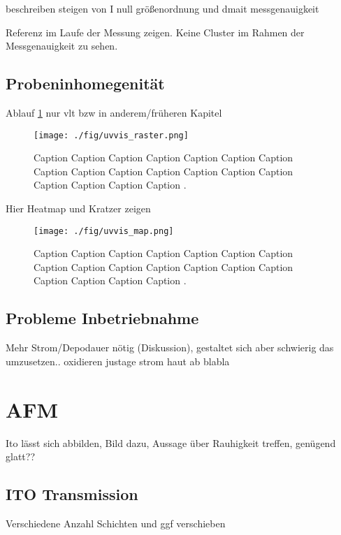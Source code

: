 beschreiben steigen von I null
größenordnung und dmait messgenauigkeit







Referenz im Laufe der Messung zeigen.
Keine Cluster im Rahmen der Messgenauigkeit zu sehen.

\subsection{Probeninhomegenität}

Ablauf \ref{fig:uvvis_raster} nur vlt bzw in anderem/früheren Kapitel
\blindtext
\begin{figure}
    \centering
    \texttt{[image: ./fig/uvvis\_raster.png]}
    \caption{Caption Caption Caption Caption Caption Caption Caption Caption Caption Caption Caption Caption Caption Caption Caption Caption Caption Caption .}
    \label{fig:uvvis_raster}
\end{figure}

\blindtext
Hier Heatmap und Kratzer zeigen
\blindtext
\begin{figure}
    \centering
    \texttt{[image: ./fig/uvvis\_map.png]}
    \caption{Caption Caption Caption Caption Caption Caption Caption Caption Caption Caption Caption Caption Caption Caption Caption Caption Caption Caption .}
    \label{fig:uvvis_map}
\end{figure}
\blindtext
\subsection{Probleme Inbetriebnahme}
Mehr Strom/Depodauer nötig (Diskussion), gestaltet sich aber schwierig das umzusetzen.. oxidieren justage strom haut ab blabla
\section{AFM}
Ito lässt sich abbilden, Bild dazu, Aussage über Rauhigkeit treffen, genügend glatt?? \

\blindmathpaper

\subsection{ITO Transmission}

Verschiedene Anzahl Schichten und ggf verschieben

